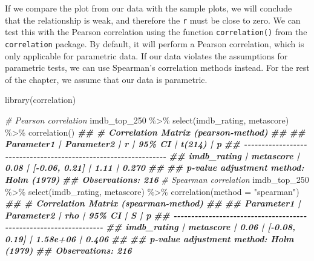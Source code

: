 \documentclass[
]{book}
\newenvironment{Shaded}{\begin{snugshade}}{\end{snugshade}}
\newcommand{\AttributeTok}[1]{\textcolor[rgb]{0.77,0.63,0.00}{#1}}
\newcommand{\CommentTok}[1]{\textcolor[rgb]{0.56,0.35,0.01}{\textit{#1}}}
\newcommand{\DocumentationTok}[1]{\textcolor[rgb]{0.56,0.35,0.01}{\textbf{\textit{#1}}}}
\newcommand{\FunctionTok}[1]{\textcolor[rgb]{0.00,0.00,0.00}{#1}}
\newcommand{\NormalTok}[1]{#1}
\newcommand{\SpecialCharTok}[1]{\textcolor[rgb]{0.00,0.00,0.00}{#1}}
\newcommand{\StringTok}[1]{\textcolor[rgb]{0.31,0.60,0.02}{#1}}
\begin{document}
If we compare the plot from our data with the sample plots, we will conclude that the relationship is weak, and therefore the \texttt{r} must be close to zero. We can test this with the Pearson correlation using the function \texttt{correlation()} from the \texttt{correlation} package. By default, it will perform a Pearson correlation, which is only applicable for parametric data. If our data violates the assumptions for parametric tests, we can use Spearman's correlation methods instead. For the rest of the chapter, we assume that our data is parametric.

\begin{Shaded}
\begin{Highlighting}[]
\FunctionTok{library}\NormalTok{(correlation)}

\CommentTok{\# Pearson correlation}
\NormalTok{imdb\_top\_250 }\SpecialCharTok{\%\textgreater{}\%} 
  \FunctionTok{select}\NormalTok{(imdb\_rating, metascore) }\SpecialCharTok{\%\textgreater{}\%} 
  \FunctionTok{correlation}\NormalTok{()}
\DocumentationTok{\#\# \# Correlation Matrix (pearson{-}method)}
\DocumentationTok{\#\# }
\DocumentationTok{\#\# Parameter1  | Parameter2 |    r |        95\% CI | t(214) |     p}
\DocumentationTok{\#\# {-}{-}{-}{-}{-}{-}{-}{-}{-}{-}{-}{-}{-}{-}{-}{-}{-}{-}{-}{-}{-}{-}{-}{-}{-}{-}{-}{-}{-}{-}{-}{-}{-}{-}{-}{-}{-}{-}{-}{-}{-}{-}{-}{-}{-}{-}{-}{-}{-}{-}{-}{-}{-}{-}{-}{-}{-}{-}{-}{-}{-}{-}{-}{-}}
\DocumentationTok{\#\# imdb\_rating |  metascore | 0.08 | [{-}0.06, 0.21] |   1.11 | 0.270}
\DocumentationTok{\#\# }
\DocumentationTok{\#\# p{-}value adjustment method: Holm (1979)}
\DocumentationTok{\#\# Observations: 216}
\CommentTok{\# Spearman correlation}
\NormalTok{imdb\_top\_250 }\SpecialCharTok{\%\textgreater{}\%} 
  \FunctionTok{select}\NormalTok{(imdb\_rating, metascore) }\SpecialCharTok{\%\textgreater{}\%} 
  \FunctionTok{correlation}\NormalTok{(}\AttributeTok{method =} \StringTok{"spearman"}\NormalTok{)}
\DocumentationTok{\#\# \# Correlation Matrix (spearman{-}method)}
\DocumentationTok{\#\# }
\DocumentationTok{\#\# Parameter1  | Parameter2 |  rho |        95\% CI |        S |     p}
\DocumentationTok{\#\# {-}{-}{-}{-}{-}{-}{-}{-}{-}{-}{-}{-}{-}{-}{-}{-}{-}{-}{-}{-}{-}{-}{-}{-}{-}{-}{-}{-}{-}{-}{-}{-}{-}{-}{-}{-}{-}{-}{-}{-}{-}{-}{-}{-}{-}{-}{-}{-}{-}{-}{-}{-}{-}{-}{-}{-}{-}{-}{-}{-}{-}{-}{-}{-}{-}{-}}
\DocumentationTok{\#\# imdb\_rating |  metascore | 0.06 | [{-}0.08, 0.19] | 1.58e+06 | 0.406}
\DocumentationTok{\#\# }
\DocumentationTok{\#\# p{-}value adjustment method: Holm (1979)}
\DocumentationTok{\#\# Observations: 216}
\end{Highlighting}
\end{Shaded}
\end{document}
